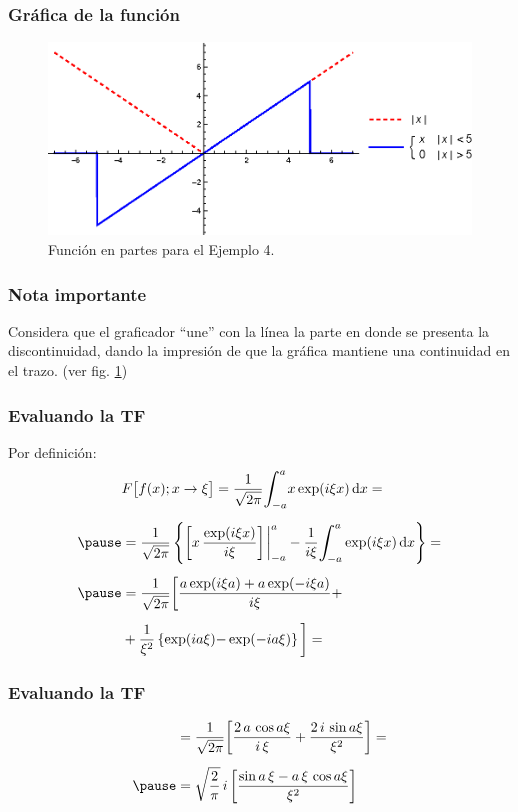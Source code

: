 \begin{frame}
\frametitle{Gráfica de la función}
\begin{figure}[H]
    \centering
    \includegraphics[scale=0.8]{Imagenes/Plot_Ejemplo_04_01.eps}
    \caption{Función en partes para el Ejemplo 4.}
    \label{fig:figura_plot_Ejemplo_04_01}
\end{figure}
\end{frame}
\begin{frame}
\frametitle{Nota importante}
Considera que el graficador \enquote{une} con la línea la parte en donde se presenta la discontinuidad, dando la impresión de que la gráfica mantiene una continuidad en el trazo. (ver fig. \ref{fig:figura_plot_Ejemplo_04_01})
\end{frame}
\begin{frame}
\frametitle{Evaluando la TF}
Por definición:
\pause
\begin{eqnarray*}
\begin{aligned}
&F \big[ f (x); x \to \xi \big] = \dfrac{1}{\sqrt{2 \pi}} \scaleint{6ex}_{\bs -a}^{a} x \exp(i \xi x) \dd{x} = \\[0.5em] \pause
&= \dfrac{1}{\sqrt{2 \pi}} \left\{ \bigg[ x \, \dfrac{\exp(i \xi x)}{i \xi} \bigg] \eval_{-a}^{a} - \dfrac{1}{i \xi} \scaleint{6ex}_{\bs -a}^{a} \exp(i \xi x) \dd{x} \right\} = \\[0.5em] \pause
&= \dfrac{1}{\sqrt{2 \pi}} \bigg[ \dfrac{a \exp(i \xi a) + a \exp(-i \xi a)}{i \xi} {+} \\[0.5em] 
&+ \dfrac{1}{\xi^{2}} \left\{ \exp(i a \xi) {-} \exp(-i a \xi) \right\} \bigg] =
\end{aligned}
\end{eqnarray*}
\end{frame}
\begin{frame}
\frametitle{Evaluando la TF}
\begin{eqnarray*}
\begin{aligned}
&= \dfrac{1}{\sqrt{2 \pi}} \bigg[ \dfrac{2 \, a \, \cos a \xi}{i \, \xi} + \dfrac{2 \, i \, \sin a \xi}{\xi^{2}} \bigg] = \\[0.5em] \pause
&= \sqrt{\dfrac{2}{\pi}} \, i \, \bigg[ \dfrac{\sin a \, \xi - a \, \xi \, \cos a \xi}{\xi^{2}} \bigg]
\end{aligned}
\end{eqnarray*}
\end{frame}
